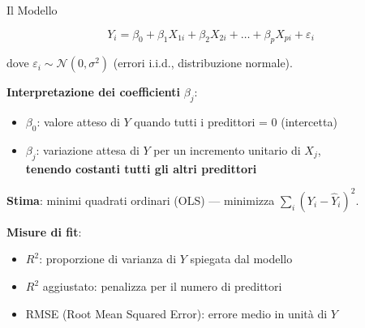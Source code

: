\documentclass[
  ignorenonframetext,
]{beamer}
\begin{document}
\begin{frame}{Il Modello}
\label{il-modello}
\small

\[Y_i = \beta_0 + \beta_1 X_{1i} + \beta_2 X_{2i} + \ldots + \beta_p X_{pi} + \varepsilon_i\]

dove \(\varepsilon_i \sim \mathcal{N}(0, \sigma^2)\) (errori i.i.d.,
distribuzione normale).

\vspace{0.4em}

\textbf{Interpretazione dei coefficienti} \(\beta_j\):

\begin{itemize}\footnotesize
\item $\beta_0$: valore atteso di $Y$ quando tutti i predittori = 0 (intercetta)
\item $\beta_j$: variazione attesa di $Y$ per un incremento unitario di $X_j$,\\ \textbf{tenendo costanti tutti gli altri predittori}
\end{itemize}

\vspace{0.4em}

\textbf{Stima}: minimi quadrati ordinari (OLS) --- minimizza
\(\sum_i (Y_i - \hat{Y}_i)^2\).

\vspace{0.4em}

\textbf{Misure di fit}:

\begin{itemize}\footnotesize
\item $R^2$: proporzione di varianza di $Y$ spiegata dal modello
\item $R^2$ aggiustato: penalizza per il numero di predittori
\item RMSE (Root Mean Squared Error): errore medio in unità di $Y$
\end{itemize}
\end{frame}
\end{document}
